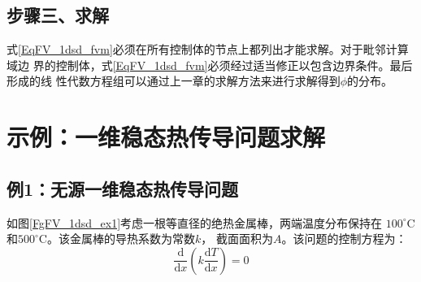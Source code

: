 \subsection{步骤三、求解}
式\eqref{EqFV_1dsd_fvm}必须在所有控制体的节点上都列出才能求解。对于毗邻计算域边
界的控制体，式\eqref{EqFV_1dsd_fvm}必须经过适当修正以包含边界条件。最后形成的线
性代数方程组可以通过上一章的求解方法来进行求解得到$\phi$的分布。

\section{示例：一维稳态热传导问题求解}
\subsection{例1：无源一维稳态热传导问题}
如图\ref{FgFV_1dsd_ex1}考虑一根等直径的绝热金属棒，两端温度分布保持在
$100^{\circ}\mathrm{C}$和$500^{\circ}\mathrm{C}$。该金属棒的导热系数为常数$k$，
截面面积为$A$。该问题的控制方程为：
\begin{equation}
\frac{\mathrm{d} }{\mathrm{d} x}
\left(
k\frac{\mathrm{d} T}{\mathrm{d} x}
\right)
=
0
\label{EqFV_1dsd_ex1_gov}
\end{equation}

